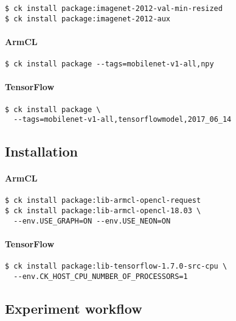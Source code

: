 \begin{verbatim}
$ ck install package:imagenet-2012-val-min-resized
$ ck install package:imagenet-2012-aux
\end{verbatim}

\paragraph{ArmCL}

\begin{verbatim}
$ ck install package --tags=mobilenet-v1-all,npy
\end{verbatim}

\paragraph{TensorFlow}

\begin{verbatim}
$ ck install package \
  --tags=mobilenet-v1-all,tensorflowmodel,2017_06_14 
\end{verbatim}


\subsection{Installation}

\paragraph{ArmCL}

\begin{verbatim}
$ ck install package:lib-armcl-opencl-request
$ ck install package:lib-armcl-opencl-18.03 \
  --env.USE_GRAPH=ON --env.USE_NEON=ON
\end{verbatim}

\paragraph{TensorFlow}

\begin{verbatim}
$ ck install package:lib-tensorflow-1.7.0-src-cpu \
  --env.CK_HOST_CPU_NUMBER_OF_PROCESSORS=1
\end{verbatim}


\subsection{Experiment workflow}

